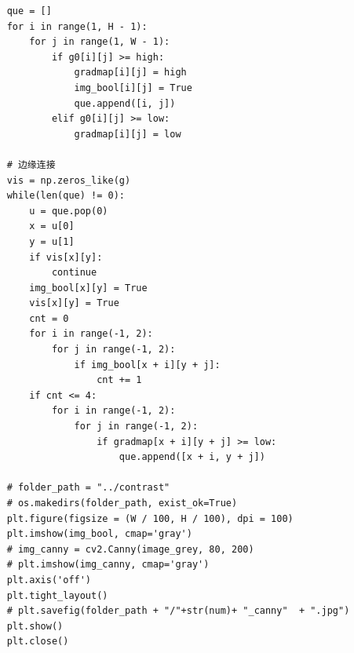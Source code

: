 \documentclass{article}
\begin{document}
\begin{lstlisting}
    que = []
    for i in range(1, H - 1):
        for j in range(1, W - 1):
            if g0[i][j] >= high:
                gradmap[i][j] = high
                img_bool[i][j] = True
                que.append([i, j])
            elif g0[i][j] >= low:
                gradmap[i][j] = low

    # 边缘连接
    vis = np.zeros_like(g)
    while(len(que) != 0):
        u = que.pop(0)
        x = u[0]
        y = u[1]
        if vis[x][y]:
            continue
        img_bool[x][y] = True
        vis[x][y] = True
        cnt = 0
        for i in range(-1, 2):
            for j in range(-1, 2):
                if img_bool[x + i][y + j]:
                    cnt += 1
        if cnt <= 4:
            for i in range(-1, 2):
                for j in range(-1, 2):
                    if gradmap[x + i][y + j] >= low:
                        que.append([x + i, y + j])

    # folder_path = "../contrast"
    # os.makedirs(folder_path, exist_ok=True)
    plt.figure(figsize = (W / 100, H / 100), dpi = 100)
    plt.imshow(img_bool, cmap='gray')
    # img_canny = cv2.Canny(image_grey, 80, 200)
    # plt.imshow(img_canny, cmap='gray')
    plt.axis('off')
    plt.tight_layout()
    # plt.savefig(folder_path + "/"+str(num)+ "_canny"  + ".jpg")
    plt.show()
    plt.close()

\end{lstlisting}
\end{document}
